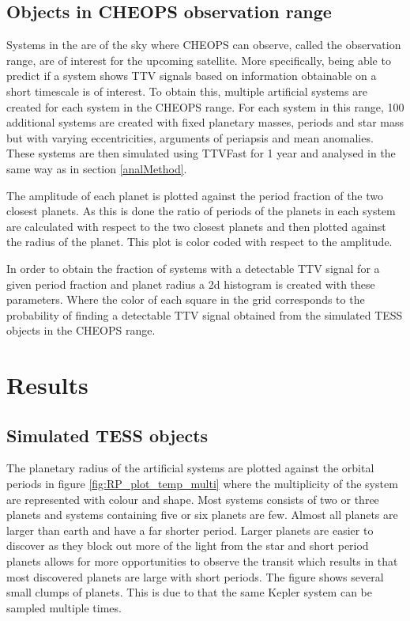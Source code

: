 \documentclass[12pt]{report}
\begin{document}
\section{Objects in CHEOPS observation range}
	Systems in the are of the sky where CHEOPS can observe, called the observation range, are of interest for the upcoming satellite. More specifically, being able to predict if a system shows TTV signals based on information obtainable on a short timescale is of interest. To obtain this, multiple artificial systems are created for each system in the CHEOPS range. For each system in this range, 100 additional systems are created with fixed planetary masses, periods and star mass but with varying eccentricities, arguments of periapsis and mean anomalies. These systems are then simulated using TTVFast for 1 year and analysed in the same way as in section \ref{analMethod}.
	
	The amplitude of each planet is plotted against the period fraction of the two closest planets. As this is done the ratio of periods of the planets in each system are calculated with respect to the two closest planets and then plotted against the radius of the planet. This plot is color coded with respect to the amplitude.
	
	In order to obtain the fraction of systems with a detectable TTV signal for a given period fraction and planet radius a 2d histogram is created with these parameters. Where the color of each square in the grid corresponds to the probability of finding a detectable TTV signal obtained from the simulated TESS objects in the CHEOPS range.


\chapter{Results}




\section{Simulated TESS objects}
	The planetary radius of the artificial systems are plotted against the orbital periods in figure \ref{fig:RP_plot_temp_multi} where the multiplicity of the system are represented with colour and shape. Most systems consists of two or three planets and systems containing five or six planets are few. Almost all planets are larger than earth and have a far shorter period. Larger planets are easier to discover as they block out more of the light from the star and short period planets allows for more opportunities to observe the transit which results in that most discovered planets are large with short periods. The figure shows several small clumps of planets. This is due to that the same Kepler system can be sampled multiple times.
\end{document}
